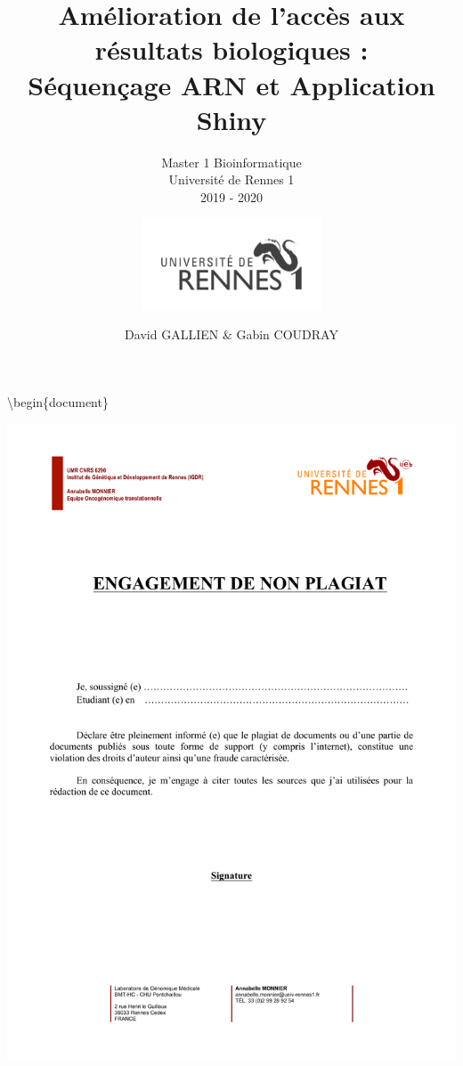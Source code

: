 \documentclass[
  12pt,
]{article}
\title{\vspace{5cm}
\textbf{Amélioration de l'accès aux résultats biologiques :}\\
\textbf{Séquençage ARN et Application Shiny}}
\subtitle{Master 1 Bioinformatique\\
Université de Rennes 1\\
2019 - 2020}
\author{\centering \includegraphics[width=0.4\textwidth]{logo.png}}
\date{David GALLIEN \& Gabin COUDRAY}
\begin{document}
\maketitle

\textbackslash begin\{document\}

\newpage
\begin{center}
\includegraphics[width=10in]{attestationDeNonPlagiat.pdf}
\end{center}
\end{document}
